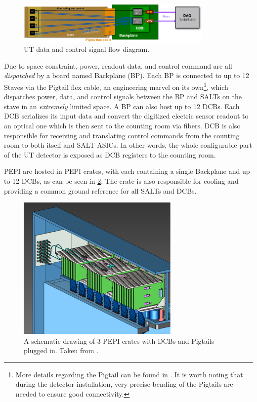 \begin{figure}[!htb]
    \centering
    \includegraphics[width=0.85\textwidth]{./figs-ut-upgrade/detector/ut_data_control_flow.pdf}
    \caption{
        UT data and control signal flow diagram.
    }
    \label{fig:ut-readout-diagram}
\end{figure}

Due to space constraint, power, readout data, and control command
are all \emph{dispatched} by a board named Backplane (BP).
Each BP is connected to up to 12 Staves via the Pigtail flex cable,
an engineering marvel on its own\footnote{
    More details regarding the Pigtail can be found in
    \cite{Andrews:2018vla}.
    It is worth noting that during the detector installation,
    very precise bending of the Pigtails are needed to ensure good connectivity.
},
which dispatches power, data, and control signals between the BP and SALTs on
the stave in an \emph{extremely} limited space.
A BP can also host up to 12 DCBs.
Each DCB serializes its input data and convert the digitized electric sensor
readout to an optical one which is then sent to the counting room via fibers.
DCB is also responsible for receiving and translating control commands from the
counting room to both itself and SALT ASICs.
In other words, the whole configurable part of the UT detector is exposed as DCB
registers to the counting room.

PEPI are hosted in PEPI crates, with each containing a single Backplane and up
to 12 DCBs,
as can be seen in \cref{fig:pepi-crate}.
The crate is also responsible for cooling and providing a common ground
reference for all SALTs and DCBs.

\begin{figure}[!htb]
    \centering
    \includegraphics[width=0.7\textwidth]{./figs-ut-upgrade/detector/pepi_crates.pdf}
    \caption{
        A schematic drawing of 3 PEPI crates with DCBs and Pigtails plugged in.
        Taken from \cite{Andrews:2018vla}.
    }
    \label{fig:pepi-crate}
\end{figure}

